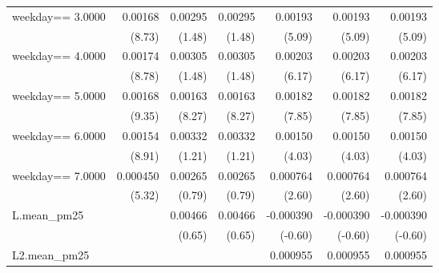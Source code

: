 \begin{table}[htbp]
\begin{tabular}{l*{6}{D{.}{.}{-1}}}
\addlinespace
weekday==     3.0000&     0.00168\sym{***}&     0.00295         &     0.00295         &     0.00193\sym{***}&     0.00193\sym{***}&     0.00193\sym{***}\\
                    &      (8.73)         &      (1.48)         &      (1.48)         &      (5.09)         &      (5.09)         &      (5.09)         \\
\addlinespace
weekday==     4.0000&     0.00174\sym{***}&     0.00305         &     0.00305         &     0.00203\sym{***}&     0.00203\sym{***}&     0.00203\sym{***}\\
                    &      (8.78)         &      (1.48)         &      (1.48)         &      (6.17)         &      (6.17)         &      (6.17)         \\
\addlinespace
weekday==     5.0000&     0.00168\sym{***}&     0.00163\sym{***}&     0.00163\sym{***}&     0.00182\sym{***}&     0.00182\sym{***}&     0.00182\sym{***}\\
                    &      (9.35)         &      (8.27)         &      (8.27)         &      (7.85)         &      (7.85)         &      (7.85)         \\
\addlinespace
weekday==     6.0000&     0.00154\sym{***}&     0.00332         &     0.00332         &     0.00150\sym{***}&     0.00150\sym{***}&     0.00150\sym{***}\\
                    &      (8.91)         &      (1.21)         &      (1.21)         &      (4.03)         &      (4.03)         &      (4.03)         \\
\addlinespace
weekday==     7.0000&    0.000450\sym{***}&     0.00265         &     0.00265         &    0.000764\sym{**} &    0.000764\sym{**} &    0.000764\sym{**} \\
                    &      (5.32)         &      (0.79)         &      (0.79)         &      (2.60)         &      (2.60)         &      (2.60)         \\
\addlinespace
L.mean\_pm25         &                     &     0.00466         &     0.00466         &   -0.000390         &   -0.000390         &   -0.000390         \\
                    &                     &      (0.65)         &      (0.65)         &     (-0.60)         &     (-0.60)         &     (-0.60)         \\
\addlinespace
L2.mean\_pm25        &                     &                     &                     &    0.000955         &    0.000955         &    0.000955         \\

\end{tabular}
\end{table}
